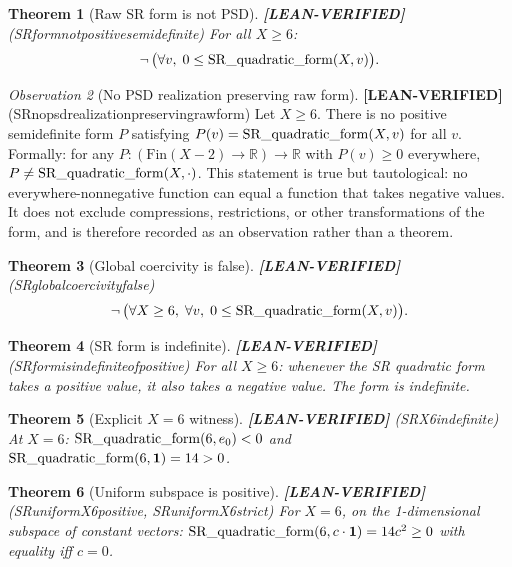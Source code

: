 \documentclass[11pt]{article}
\newtheorem{theorem}{Theorem}[section]
\theoremstyle{remark}
\newtheorem{observation}[theorem]{Observation}
\newcommand{\LEANVERIFIED}{\textbf{\color{green!60!black}[LEAN-VERIFIED]}}
\DeclareRobustCommand{\_}{\ifmmode\text{\textunderscore}\else\textunderscore\allowbreak\fi}
\begin{document}
\begin{theorem}[Raw SR form is not PSD] \LEANVERIFIED{} \textnormal{(SR\_form\_not\_positive\_semidefinite)}
For all $X \geq 6$:
\[
\neg\,\bigl(\forall v,\; 0 \leq \operatorname{SR\_quadratic\_form}(X, v)\bigr).
\]
\end{theorem}

\begin{observation}[No PSD realization preserving raw form] \LEANVERIFIED{} \textnormal{(SR\_no\_psd\_realization\_preserving\_raw\_form)}
Let $X \geq 6$. There is no positive semidefinite form $P$ satisfying
$P(v) = \operatorname{SR\_quadratic\_form}(X, v)$ for all $v$.
Formally: for any $P : (\mathrm{Fin}(X-2) \to \mathbb{R}) \to \mathbb{R}$ with $P(v) \geq 0$ everywhere,
$P \neq \operatorname{SR\_quadratic\_form}(X, \cdot)$.
This statement is true but tautological: no everywhere-nonnegative function can equal a function that takes negative values. It does not exclude compressions, restrictions, or other transformations of the form, and is therefore recorded as an observation rather than a theorem.
\end{observation}

\begin{theorem}[Global coercivity is false] \LEANVERIFIED{} \textnormal{(SR\_global\_coercivity\_false)}
\[
\neg\,\bigl(\forall X \geq 6,\; \forall v,\; 0 \leq \operatorname{SR\_quadratic\_form}(X, v)\bigr).
\]
\end{theorem}

\begin{theorem}[SR form is indefinite] \LEANVERIFIED{} \textnormal{(SR\_form\_is\_indefinite\_of\_positive)}
For all $X \geq 6$: whenever the SR quadratic form takes a positive value,
it also takes a negative value. The form is indefinite.
\end{theorem}

\begin{theorem}[Explicit $X=6$ witness] \LEANVERIFIED{} \textnormal{(SR\_X6\_indefinite)}
At $X = 6$: $\operatorname{SR\_quadratic\_form}(6, e_0) < 0$ and $\operatorname{SR\_quadratic\_form}(6, \mathbf{1}) = 14 > 0$.
\end{theorem}

\begin{theorem}[Uniform subspace is positive] \LEANVERIFIED{} \textnormal{(SR\_uniform\_X6\_positive, SR\_uniform\_X6\_strict)}
For $X=6$, on the 1-dimensional subspace of constant vectors:
$\operatorname{SR\_quadratic\_form}(6, c\cdot\mathbf{1}) = 14c^2 \geq 0$ with equality iff $c=0$.
\end{theorem}
\end{document}
